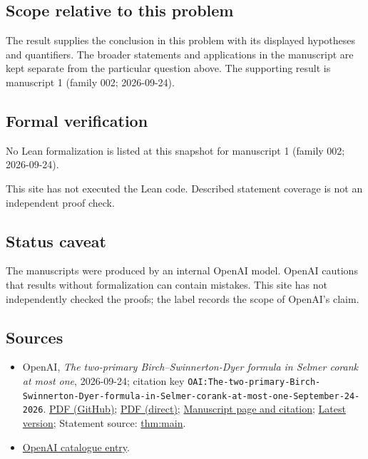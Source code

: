 \documentclass[11pt]{article}
\begin{document}
\subsection{Scope relative to this problem}
The result supplies the conclusion in this problem with its displayed hypotheses and quantifiers. The broader statements and applications in the manuscript are kept separate from the particular question above. The supporting result is manuscript 1 (family 002; 2026-09-24).

\subsection{Formal verification}
No Lean formalization is listed at this snapshot for manuscript 1 (family 002; 2026-09-24).

This site has not executed the Lean code. Described statement coverage is not an independent proof check.

\subsection{Status caveat}
The manuscripts were produced by an internal OpenAI model. OpenAI cautions that results without formalization can contain mistakes. This site has not independently checked the proofs; the label records the scope of OpenAI's claim.

\subsection{Sources}
\begin{itemize}
\item OpenAI, \emph{The two-primary Birch–Swinnerton-Dyer formula in Selmer corank at most one}, 2026-09-24; citation key \texttt{OAI:The-two-primary-Birch-Swinnerton-Dyer-formula-in-Selmer-corank-at-most-one-September-24-2026}. \href{https://github.com/openai/math/blob/adc7f1241b42e322a6451854ab7e4b4c146bf78a/preprints/The-two-primary-Birch-Swinnerton-Dyer-formula-in-Selmer-corank-at-most-one-September-24-2026/paper.pdf}{PDF (GitHub)}; \href{https://github.com/openai/math/raw/adc7f1241b42e322a6451854ab7e4b4c146bf78a/preprints/The-two-primary-Birch-Swinnerton-Dyer-formula-in-Selmer-corank-at-most-one-September-24-2026/paper.pdf}{PDF (direct)}; \href{https://github.com/openai/math/blob/adc7f1241b42e322a6451854ab7e4b4c146bf78a/preprints/The-two-primary-Birch-Swinnerton-Dyer-formula-in-Selmer-corank-at-most-one-September-24-2026/README.md}{Manuscript page and citation}; \href{https://github.com/openai/math/blob/main/preprints/The-two-primary-Birch-Swinnerton-Dyer-formula-in-Selmer-corank-at-most-one-September-24-2026/paper.pdf}{Latest version}; Statement source: \href{https://github.com/openai/math/blob/adc7f1241b42e322a6451854ab7e4b4c146bf78a/preprints/The-two-primary-Birch-Swinnerton-Dyer-formula-in-Selmer-corank-at-most-one-September-24-2026/build/sections/01-introduction.tex\#L54}{thm:main}.
\item \href{https://github.com/openai/math/blob/adc7f1241b42e322a6451854ab7e4b4c146bf78a/CONTENTS.md}{OpenAI catalogue entry}.
\end{itemize}
\end{document}
